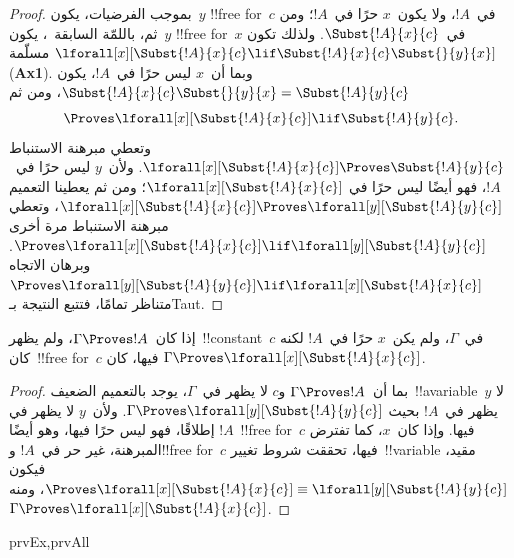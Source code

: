 \documentclass[../../../include/open-logic-section]{subfiles}
\begin{document}
\begin{proof}
بموجب الفرضيات، يكون~$y$ !!{free for}~$c$ في~$!A$، ولا يكون~$x$ حرًا
في~$!A$؛ ومن ثم، باللمّة السابقة~، يكون~$y$
!!{free for}~$x$ في~$\Subst{!A}{x}{c}$. ولذلك تكون
$\lforall[x][\Subst{!A}{x}{c} \lif
\Subst{!A}{x}{c} \Subst{}{y}{x}]$ مسلّمة (\textbf{Ax1}). وبما أن~$x$
ليس حرًا في~$!A$، يكون
$\Subst{!A}{x}{c} \Subst{}{y}{x} = \Subst{!A}{y}{c}$، ومن ثم
\[
\Proves \lforall[x][\Subst{!A}{x}{c}] \lif \Subst{!A}{y}{c}.
\]
وتعطي مبرهنة الاستنباط
$\lforall[x][\Subst{!A}{x}{c}] \Proves \Subst{!A}{y}{c}$. ولأن~$y$
ليس حرًا في~$!A$، فهو أيضًا ليس حرًا في
$\lforall[x][\Subst{!A}{x}{c}]$؛ ومن ثم يعطينا التعميم
$\lforall[x][\Subst{!A}{x}{c}] \Proves
\lforall[y][\Subst{!A}{y}{c}]$، وتعطي مبرهنة الاستنباط مرة أخرى
$\Proves \lforall[x][\Subst{!A}{x}{c}] \lif
\lforall[y][\Subst{!A}{y}{c}]$. وبرهان الاتجاه
$\Proves \lforall[y][\Subst{!A}{y}{c}] \lif
\lforall[x][\Subst{!A}{x}{c}]$ متناظر تمامًا، فتتبع النتيجة بـTaut.
\end{proof}

\begin{thm}
إذا كان~$\Gamma \Proves !A$، ولم يظهر~!!{constant}~$c$ في~$\Gamma$،
ولم يكن~$x$ حرًا في~$!A$ لكنه كان~!!{free for}~$c$ فيها، كان
$\Gamma \Proves \lforall[x][\Subst{!A}{x}{c}]$.
\end{thm}

\begin{proof}
بما أن~$\Gamma \Proves !A$ و$c$ لا يظهر في~$\Gamma$، يوجد بالتعميم
الضعيف~!!a{variable}~$y$ لا يظهر في~$!A$ بحيث
$\Gamma \Proves \lforall[y][\Subst{!A}{y}{c}]$. ولأن~$y$ لا يظهر في
$!A$ إطلاقًا، فهو ليس حرًا فيها، وهو أيضًا~!!{free for}~$c$ فيها. وإذا
كان~$x$، كما تفترض المبرهنة، غير حر في~$!A$ و!!{free for}~$c$ فيها،
تحققت شروط تغيير~!!{variable} مقيد، فيكون
$\Proves \lforall[x][\Subst{!A}{x}{c}] \equiv
\lforall[y][\Subst{!A}{y}{c}]$، ومنه
$\Gamma \Proves \lforall[x][\Subst{!A}{x}{c}]$.
\end{proof}

\begin{thm}
\begin{tagenumerate}{prvEx,prvAll}
\end{tagenumerate}
\end{thm}
\end{document}
